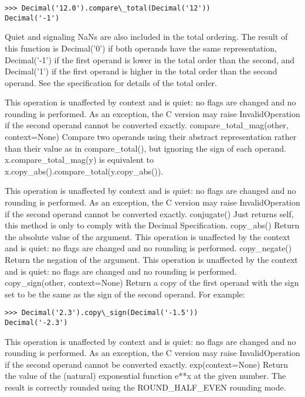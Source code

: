 \begin{lstlisting}
>>> Decimal('12.0').compare\_total(Decimal('12'))
Decimal('-1')
\end{lstlisting}

Quiet and signaling NaNs are also included in the total ordering. The result of this function is Decimal('0') if both operands have the same representation, Decimal('-1') if the first operand is lower in the total order than the second, and Decimal('1') if the first operand is higher in the total order than the second operand. See the specification for details of the total order.

This operation is unaffected by context and is quiet: no flags are changed and no rounding is performed. As an exception, the C version may raise InvalidOperation if the second operand cannot be converted exactly.
compare\_total\_mag(other, context=None)
Compare two operands using their abstract representation rather than their value as in compare\_total(), but ignoring the sign of each operand. x.compare\_total\_mag(y) is equivalent to x.copy\_abs().compare\_total(y.copy\_abs()).

This operation is unaffected by context and is quiet: no flags are changed and no rounding is performed. As an exception, the C version may raise InvalidOperation if the second operand cannot be converted exactly.
conjugate()
Just returns self, this method is only to comply with the Decimal Specification.
copy\_abs()
Return the absolute value of the argument. This operation is unaffected by the context and is quiet: no flags are changed and no rounding is performed.
copy\_negate()
Return the negation of the argument. This operation is unaffected by the context and is quiet: no flags are changed and no rounding is performed.
copy\_sign(other, context=None)
Return a copy of the first operand with the sign set to be the same as the sign of the second operand. For example:

\begin{lstlisting}
>>> Decimal('2.3').copy\_sign(Decimal('-1.5'))
Decimal('-2.3')
\end{lstlisting}

This operation is unaffected by context and is quiet: no flags are changed and no rounding is performed. As an exception, the C version may raise InvalidOperation if the second operand cannot be converted exactly.
exp(context=None)
Return the value of the (natural) exponential function e**x at the given number. The result is correctly rounded using the ROUND\_HALF\_EVEN rounding mode.

